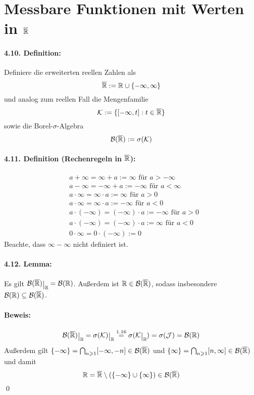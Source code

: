   \section*{Messbare Funktionen mit Werten in $\overline{\mathbb{R}}$}
  
  
  \paragraph{4.10. Definition:}Definiere die erweiterten reellen Zahlen als
  $$\overline{\mathbb{R}}:=\mathbb{R}\cup\{-\infty,\infty\}$$
  und analog zum reellen Fall die Mengenfamilie
  $$\mathcal{K}:=\{[-\infty,t]:t\in\overline{\mathbb{R}}\}$$
  sowie die Borel-$\sigma$-Algebra
  $$\mathcal{B}(\overline{\mathbb{R}}):=\sigma(\mathcal{K})$$
  
  \paragraph{4.11. Definition (Rechenregeln in $\overline{\mathbb{R}}$):}
  \begin{align*}
      &a+\infty=\infty+a:=\infty\text{ f\"ur }a>-\infty\\
      &a-\infty=-\infty+a:=-\infty\text{ f\"ur }a<\infty\\
      &a\cdot\infty=\infty\cdot a:=\infty\text{ f\"ur }a>0\\
      &a\cdot\infty=\infty\cdot a:=-\infty\text{ f\"ur }a<0\\
      &a\cdot(-\infty)=(-\infty)\cdot a:=-\infty\text{ f\"ur }a>0\\
      &a\cdot(-\infty)=(-\infty)\cdot a:=\infty\text{ f\"ur }a<0\\
      &0\cdot\infty=0\cdot(-\infty):=0
  \end{align*}
  Beachte, dass $\infty-\infty$ nicht definiert ist.
  
  \paragraph{4.12. Lemma:} Es gilt $\cB(\overline\R)\krestr{\R}=\borel$. Au\ss{}erdem ist $\mathbb{R}\in\mathcal{B}(\overline{\mathbb{R}})$, sodass insbesondere $\mathcal{B}(\mathbb{R})\subseteq\mathcal{B}(\overline{\mathbb{R}})$.
 
 \paragraph{Beweis:}
 $$\cB(\overline\R)\krestr{\R}=\sigma(\mathcal{K})\krestr{\R}\overset{1.16}{=}\sigma(\mathcal{K}\krestr{\R})=\sigma(\mathcal{J})=\borel$$
 Au\ss{}erdem gilt $\{-\infty\}=\bigcap_{n\geqslant1}[-\infty,-n]\in\mathcal{B}(\overline{\mathbb{R}})$ und $\{\infty\}=\bigcap_{n\geqslant1}[n,\infty]\in\mathcal{B}(\overline{\mathbb{R}})$ und damit 
 $$\mathbb{R}=\overline{\mathbb{R}}\setminus(\{-\infty\}\cup\{\infty\})\in\mathcal{B}(\overline{\mathbb{R}})$$
 \qed
 
